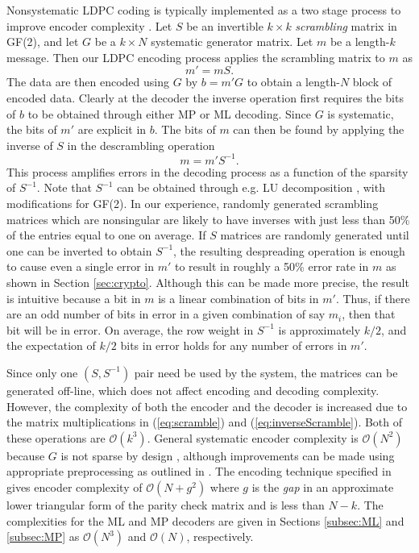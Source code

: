 \documentclass[10pt,twocolumn,twoside]{IEEEtran} \newlength{\pic}
\theoremstyle{definition}
\theoremstyle{remark}
\theoremstyle{plain}
\begin{document}
Nonsystematic LDPC coding is typically implemented as a two stage process to improve encoder complexity \cite{Alloum05, Shamir05, Baldi10}. Let $S$ be an invertible $k \times k$ \emph{scrambling} matrix in GF(2), and let $G$ be a $k \times N$ systematic generator matrix. Let $m$ be a length-$k$ message. Then our LDPC encoding process applies the scrambling matrix to $m$ as
\begin{equation}\label{eq:scramble}
  m' = mS.
\end{equation}
The data are then encoded using $G$ by $b = m'G$ to obtain a length-$N$ block of encoded data. Clearly at the decoder the inverse operation first requires the bits of $b$ to be obtained through either MP or ML decoding. Since $G$ is systematic, the bits of $m'$ are explicit in $b$. The bits of $m$ can then be found by applying the inverse of $S$ in the descrambling operation
\begin{equation}\label{eq:inverseScramble}
  m = m'S^{-1}.
\end{equation}
This process amplifies errors in the decoding process as a function of the sparsity of $S^{-1}$. Note that $S^{-1}$ can be obtained through e.g. LU decomposition \cite{MoonBlack}, with modifications for GF(2). In our experience, randomly generated scrambling matrices which are nonsingular are likely to have inverses with just less than 50\% of the entries equal to one on average. If $S$ matrices are randomly generated until one can be inverted to obtain $S^{-1}$, the resulting despreading operation is enough to cause even a single error in $m'$ to result in roughly a 50\% error rate in $m$ as shown in Section \ref{sec:crypto}. Although this can be made more precise, the result is intuitive because a bit in $m$ is a linear combination of bits in $m'$. Thus, if there are an odd number of bits in error in a given combination of say $m_i$, then that bit will be in error. On average, the row weight in $S^{-1}$ is approximately $k/2$, and the expectation of $k/2$ bits in error holds for any number of errors in $m'$.

Since only one $(S,S^{-1})$ pair need be used by the system, the matrices can be generated off-line, which does not affect encoding and decoding complexity. However, the complexity of both the encoder and the decoder is increased due to the matrix multiplications in (\ref{eq:scramble}) and (\ref{eq:inverseScramble}). Both of these operations are $\mathcal{O}(k^3)$. General systematic encoder complexity is $\mathcal{O}(N^2)$ because $G$ is not sparse by design \cite{MoonArches}, although improvements can be made using appropriate preprocessing as outlined in \cite{Urbanke01}. The encoding technique specified in \cite{Urbanke01} gives encoder complexity of $\mathcal{O}(N + g^2)$ where $g$ is the \emph{gap} in an approximate lower triangular form of the parity check matrix and is less than $N - k$. The complexities for the ML and MP decoders are given in Sections \ref{subsec:ML} and \ref{subsec:MP} as $\mathcal{O}(N^3)$ and $\mathcal{O}(N)$, respectively.
\end{document}
